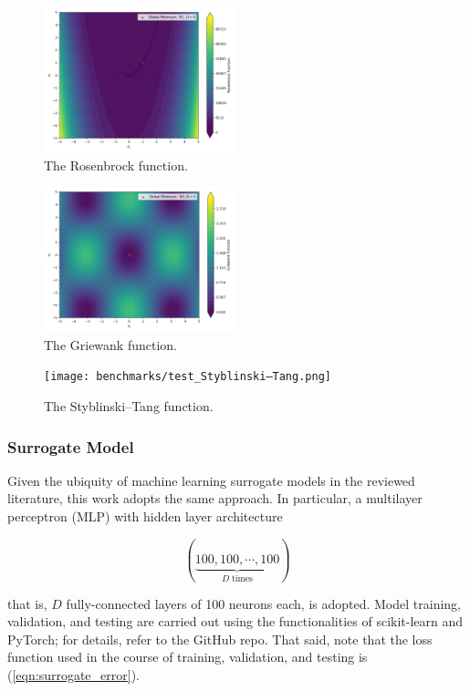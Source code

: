 \documentclass[conference]{IEEEtran}
\begin{document}
\begin{figure}[htbp]
	\centerline{\includegraphics[width=0.5\textwidth]{benchmarks/test_Rosenbrock.png}}
	\caption{The Rosenbrock function.}
	\label{fig:Rosenbrock}
\end{figure}

\begin{figure}[htbp]
	\centerline{\includegraphics[width=0.5\textwidth]{benchmarks/test_Griewank.png}}
	\caption{The Griewank function.}
	\label{fig:Griewank}
\end{figure}

\begin{figure}[htbp]
	\centerline{\texttt{[image: benchmarks/test\_Styblinski–Tang.png]}}
	\caption{The Styblinski–Tang function.}
	\label{fig:Styblinski–Tang}
\end{figure}

\subsubsection{Surrogate Model}

Given the ubiquity of machine learning surrogate models in the reviewed literature, this work adopts the same approach. In particular, a multilayer perceptron (MLP) with hidden layer architecture

$$ \left(\underbrace{100, 100, \cdots, 100}_{D\;\textrm{times}}\right) $$

\noindent that is, $D$ fully-connected layers of 100 neurons each, is adopted. Model training, validation, and testing are carried out using the functionalities of scikit-learn and PyTorch; for details, refer to the GitHub repo. That said, note that the loss function used in the course of training, validation, and testing is (\ref{eqn:surrogate_error}).
\end{document}

